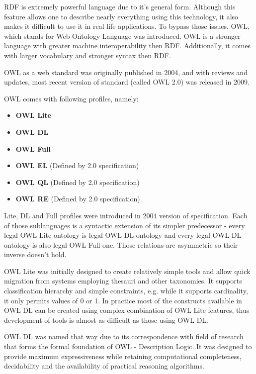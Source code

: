 RDF is extremely powerful language due to it\rq{}s general form. Although this feature allows one to describe nearly everything using this technology, it also makes it difficult to use it in real life applications. To bypass those issues, OWL, which stands for Web Ontology Language was introduced. OWL is a stronger language with greater machine interoperability then RDF. Additionally, it comes with larger vocabulary and stronger syntax then RDF.

OWL as a web standard was originally published in 2004, and with reviews and updates, most recent version of standard (called OWL 2.0) was released in 2009\cite{owlRef:2009, owlPrimer:2009}.

OWL comes with following profiles, namely:

\begin{itemize}
\item{ {\bf OWL Lite}}
\item{ {\bf OWL DL}}
\item{ {\bf OWL Full}}
\item{ {\bf OWL EL} (Defined by 2.0 specification)}
\item{ {\bf OWL QL} (Defined by 2.0 specification)}
\item{ {\bf OWL RE} (Defined by 2.0 specification)}
\end{itemize}

Lite, DL and Full profiles were introduced in 2004 version of specification. Each of those sublanguages is a syntactic extension of its simpler predecessor - every legal OWL Lite ontology is legal OWL DL ontology and every legal OWL DL ontology is also legal OWL Full one. Those relations are asymmetric so their inverse doesn\rq{}t hold. 

OWL Lite was initially designed to create relatively simple tools and allow quick migration from systems employing thesauri and other taxonomies. It supports classification hierarchy and simple constraints, e.g. while it supports cardinality, it only permits values of 0 or 1. In practice most of the constructs available in OWL DL can be created using complex combination of OWL Lite features, thus development of tools is almost as difficult as those using OWL DL. 

OWL DL was named that way due to its correspondence with field of research that forms the formal foundation of OWL - Description Logic. It was designed to provide maximum expressiveness while retaining computational completeness, decidability and the availability of practical reasoning algorithms. 

